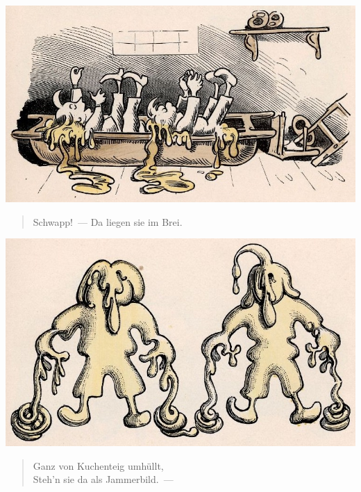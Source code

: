 \documentclass[a4paper,12pt]{article}
\begin{document}
\begin{center}\includegraphics[scale=.7, alt={... und in den Brei}]{images/6-08.jpg}\end{center}



\begin{verse}
Schwapp!~— Da liegen sie im Brei.
\end{verse}



\begin{center}\includegraphics[scale=.7, alt={Voll Kuchenteig}]{images/6-09.jpg}\end{center}



\begin{verse}
Ganz von Kuchenteig umhüllt,\\{}
Steh'n sie da als Jammerbild.~—
\end{verse}
\end{document}
